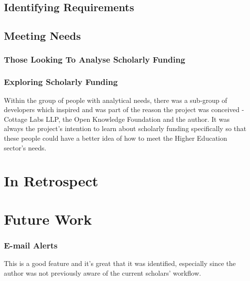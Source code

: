 \subsection{Identifying Requirements}

\subsection{Meeting Needs}

\subsubsection{Those Looking To Analyse Scholarly Funding}

\subsubsection{Exploring Scholarly Funding}
Within the group of people with analytical needs, there was a sub-group of developers which inspired and was part of the reason the project was conceived - Cottage Labs LLP, the Open Knowledge Foundation and the author. It was always the project's intention to learn about scholarly funding specifically so that these people could have a better idea of how to meet the Higher Education sector's needs.

\section{In Retrospect}

\section{Future Work}
\label{future-work}


\subsubsection{E-mail Alerts}
This is a good feature and it's great that it was identified, especially since the author was not previously aware of the current scholars' workflow.

